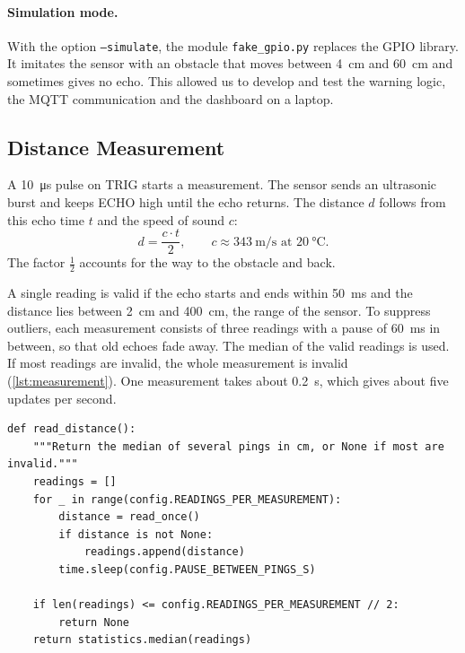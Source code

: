 \documentclass[11pt,a4paper]{article}
\begin{document}
\paragraph{Simulation mode.} With the option \texttt{--simulate}, the module
\texttt{fake\_gpio.py} replaces the GPIO library. It imitates the sensor with an
obstacle that moves between \qty{4}{\centi\metre} and \qty{60}{\centi\metre}
and sometimes gives no echo. This allowed us to develop and test the warning
logic, the MQTT communication and the dashboard on a laptop.

\subsection{Distance Measurement}
A \qty{10}{\micro\second} pulse on TRIG starts a measurement. The sensor sends an
ultrasonic burst and keeps ECHO high until the echo returns. The distance $d$
follows from this echo time $t$ and the speed of sound $c$:
\begin{equation}
  d = \frac{c \cdot t}{2}, \qquad c \approx \qty{343}{\metre\per\second}
  \text{ at } \qty{20}{\celsius}.
  \label{eq:distance}
\end{equation}
The factor $\frac{1}{2}$ accounts for the way to the obstacle and back.

A single reading is valid if the echo starts and ends within
\qty{50}{\milli\second} and the distance lies between \qty{2}{\centi\metre} and
\qty{400}{\centi\metre}, the range of the sensor. To suppress outliers, each
measurement consists of three readings with a pause of \qty{60}{\milli\second}
in between, so that old echoes fade away. The median of the valid readings is
used. If most readings are invalid, the whole measurement is invalid
(\cref{lst:measurement}). One measurement takes about \qty{0.2}{\second}, which
gives about five updates per second.

\begin{lstlisting}[caption={Median of several readings (\texttt{sensor.py}).},label={lst:measurement}]
def read_distance():
    """Return the median of several pings in cm, or None if most are invalid."""
    readings = []
    for _ in range(config.READINGS_PER_MEASUREMENT):
        distance = read_once()
        if distance is not None:
            readings.append(distance)
        time.sleep(config.PAUSE_BETWEEN_PINGS_S)

    if len(readings) <= config.READINGS_PER_MEASUREMENT // 2:
        return None
    return statistics.median(readings)
\end{lstlisting}
\end{document}

